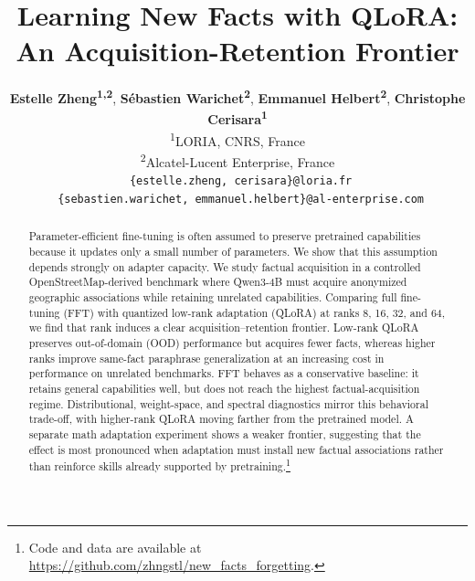 \documentclass[11pt]{article}
\title{Learning New Facts with QLoRA: An Acquisition-Retention Frontier}
\author{
 \textbf{Estelle Zheng\textsuperscript{1,2}},
 \textbf{Sébastien Warichet\textsuperscript{2}},
 \textbf{Emmanuel Helbert\textsuperscript{2}},
 \textbf{Christophe Cerisara\textsuperscript{1}}
\\
 \textsuperscript{1}LORIA, CNRS, France \\
 \textsuperscript{2}Alcatel-Lucent Enterprise, France \\
    \texttt{ \{estelle.zheng, cerisara\}@loria.fr} \\
    \texttt{ \{sebastien.warichet, emmanuel.helbert\}@al-enterprise.com}
}
\begin{document}
\maketitle
\begin{abstract}


Parameter-efficient fine-tuning is often assumed to preserve pretrained
capabilities because it updates only a small number of parameters. We show that
this assumption depends strongly on adapter capacity. We study factual
acquisition in a controlled OpenStreetMap-derived benchmark where Qwen3-4B must
acquire anonymized geographic associations while retaining unrelated capabilities.
Comparing full fine-tuning (FFT) with quantized low-rank adaptation (QLoRA) at
ranks 8, 16, 32, and 64, we find that rank
induces a clear acquisition--retention frontier. Low-rank QLoRA preserves
out-of-domain (OOD) performance but acquires fewer facts, whereas higher ranks improve
same-fact paraphrase generalization at an increasing cost in performance on
unrelated benchmarks.
FFT behaves as a conservative baseline: it retains general
capabilities well, but does not reach the highest factual-acquisition regime.
Distributional, weight-space, and spectral diagnostics mirror this behavioral
trade-off, with higher-rank QLoRA moving farther from the pretrained model. A
separate math adaptation experiment shows a weaker frontier, suggesting that the
effect is most pronounced when adaptation must install new factual associations
rather than reinforce skills already supported by pretraining.\footnote{Code and data
are available at
\url{https://github.com/zhngstl/new_facts_forgetting}.}
\end{abstract}
\end{document}
